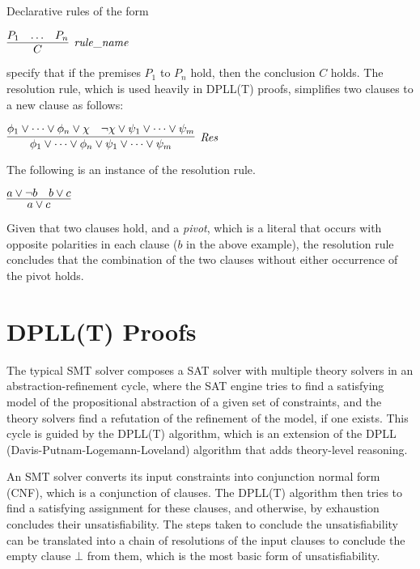 \documentclass[11pt]{article}
\begin{document}
	Declarative rules of the form
	\begin{center}
		$\infer[\mathit{rule\_name}]{C}{P_1 & \ldots & P_n}$
	\end{center}
	specify that if the premises $P_1$ to 
	$P_n$ hold, then the conclusion $C$
	holds. The resolution rule,
	which is used heavily in DPLL(T) proofs,
	simplifies two 
	clauses to a new clause as follows:
	\begin{center}
		$\infer[\mathit{Res}]{\phi_1 \lor \cdots \lor 
			\phi_n \lor \psi_1 \lor \cdots \lor 
			\psi_m}{\phi_1 \lor \cdots \lor \phi_n 
			\lor \chi & \neg \chi \lor \psi_1 
			\lor \cdots \lor \psi_m}$ 
	\end{center}
	The following is an instance of the 
	resolution rule.
	\begin{center}
		$\infer{a \lor c}{a \lor \neg b 
			& b \lor c}$
	\end{center}
	Given that two clauses hold, 
	and a \textit{pivot}, which is a 
	literal that occurs with opposite 
	polarities in each clause ($b$ in 
	the above example), the resolution 
	rule concludes that 
	the combination of the two clauses 
	without either occurrence of the 
	pivot holds.
	

\section{DPLL(T) Proofs}
\label{sec:smtproofs}
	The typical SMT solver composes 
	a SAT solver with multiple theory
	solvers in an abstraction-refinement
	cycle, where the SAT engine 
	tries to find a satisfying 
	model of the propositional
	abstraction of a given set of 
	constraints, and the theory
	solvers find a refutation of 
	the refinement of the model, if 
	one exists.
	This cycle is guided by the 
	DPLL(T) algorithm, which is an
	extension of the 
	DPLL~\cite{Loveland2016}
	(Davis-Putnam-Logemann-Loveland) 
	algorithm that adds theory-level 
	reasoning.
	
	An SMT solver converts its input 
	constraints into conjunction 
	normal form (CNF), which is a 
	conjunction of clauses. The 
	DPLL(T) algorithm then tries 
	to find a satisfying assignment 
	for these clauses, and 
	otherwise, by exhaustion 
	concludes their unsatisfiability.
	The steps taken to conclude 
	the unsatisfiability can be 
	translated into a chain of 
	resolutions of the input clauses 
	to conclude the empty clause 
	$\bot$ from them, which is the 
	most basic form of unsatisfiability.
	
\end{document}
